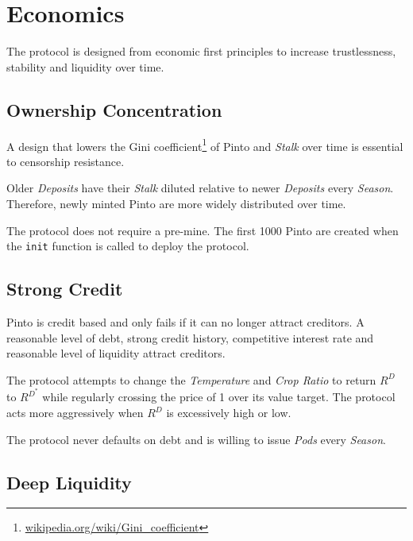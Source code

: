\documentclass[tikz]{article}
\newcommand{\code}[1]{\texttt{#1}}
\newcommand{\term}[1]{\textsl{#1}}
\newcommand{\fref}[1]{\footnote{\href{http://#1}{#1}}}
\newcommand{\Pinto}{} %
\begin{document}
\vspace{0.1cm}
\section{Economics}
\vspace{0.1cm}

The protocol is designed from economic first principles to increase trustlessness, stability and liquidity over time.


\vspace{0.1cm}
\subsection{Ownership Concentration}

A design that lowers the Gini coefficient\fref{wikipedia.org/wiki/Gini\_coefficient} of Pinto and \term{Stalk} over time is essential to censorship resistance.

Older \term{Deposits} have their \term{Stalk} diluted relative to newer \term{Deposits} every \term{Season}. Therefore, newly minted Pinto are more widely distributed over time.

The protocol does not require a pre-mine. The first 1000 Pinto are created when the \code{init} function is called to deploy the protocol.


\subsection{Strong Credit}

Pinto is credit based and only fails if it can no longer attract creditors. A reasonable level of debt, strong credit history, competitive interest rate and reasonable level of liquidity attract creditors. 

The protocol attempts to change the \term{Temperature} and \term{Crop Ratio} to return $R^{D}$ to $R^{D^{*}}$ while regularly crossing the price of \Pinto1 over its value target. The protocol acts more aggressively when $R^{D}$ is excessively high or low.

The protocol never defaults on debt and is willing to issue \term{Pods} every \term{Season}. 


\subsection{Deep Liquidity}
\end{document}
